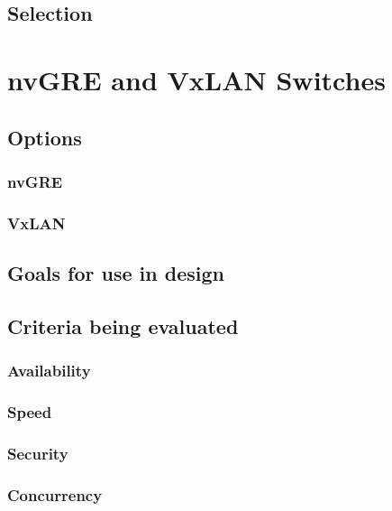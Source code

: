 \documentclass[10pt,letterpaper,onecolumn,draftclsnofoot]{IEEEtran}
\begin{document}
\subsection{Selection}


\section{nvGRE and VxLAN Switches}

\subsection{Options}

\subsubsection{nvGRE}

\subsubsection{VxLAN}

\subsubsection{}

\subsection{Goals for use in design}

\subsection{Criteria being evaluated}

\subsubsection{Availability}

\subsubsection{Speed}

\subsubsection{Security}

\subsubsection{Concurrency}
\end{document}
